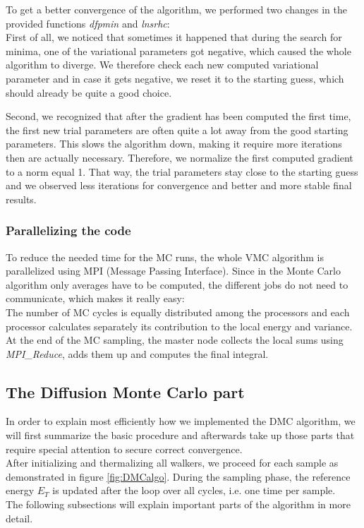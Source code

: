 To get a better convergence of the algorithm, we performed two changes in the provided functions \textit{dfpmin} and \textit{lnsrhc}:\\
 First of all, we noticed that sometimes it happened that during the search for minima, one of the variational parameters got negative, which caused the whole algorithm to diverge.  We therefore check each new computed variational parameter and in case it gets negative, we reset it to the starting guess, which should already be quite a good choice.

Second, we recognized that after the gradient has been computed the first time, the first new trial parameters are often quite a lot away from the good starting parameters. This slows the algorithm down, making it require more iterations then are actually necessary. Therefore, we normalize the first computed gradient to a norm equal 1. That way, the trial parameters stay close to the starting guess and we observed less iterations for convergence and better and more stable final results.

\subsubsection{Parallelizing the code}

To reduce the needed time for the MC runs, the whole VMC algorithm is parallelized using MPI (Message Passing Interface).
Since in the Monte Carlo algorithm only averages have to be computed, the different jobs do not need to communicate, which makes it really easy:\\
The number of MC cycles is equally distributed among the processors and each processor calculates separately its contribution to the local energy and variance. At the end of the MC sampling, the master node collects the local sums using \textit{MPI\_Reduce}, adds them up and computes the final integral.

\subsection{The Diffusion Monte Carlo part}
In order to explain most efficiently how we implemented the DMC algorithm, we will first summarize the basic procedure and afterwards take up those parts that require special attention to secure correct convergence.\\
After initializing and thermalizing all walkers, we proceed for each sample as demonstrated in figure \ref{fig:DMCalgo}. During the sampling phase, the reference energy $E_T$ is updated after the loop over all cycles, i.e. one time per sample.\\
The following subsections will explain important parts of the algorithm in more detail.


